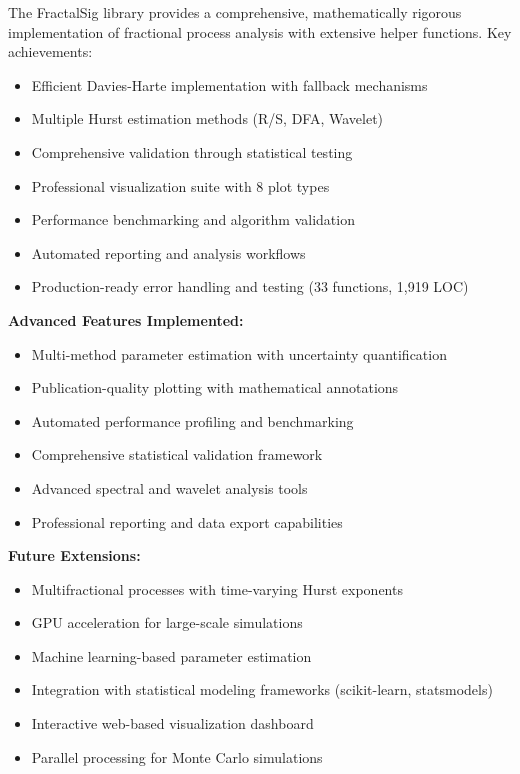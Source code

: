 \documentclass[11pt,a4paper]{article}
\begin{document}
The FractalSig library provides a comprehensive, mathematically rigorous implementation of fractional process analysis with extensive helper functions. Key achievements:

\begin{itemize}
    \item Efficient Davies-Harte implementation with fallback mechanisms
    \item Multiple Hurst estimation methods (R/S, DFA, Wavelet)
    \item Comprehensive validation through statistical testing
    \item Professional visualization suite with 8 plot types
    \item Performance benchmarking and algorithm validation
    \item Automated reporting and analysis workflows
    \item Production-ready error handling and testing (33 functions, 1,919 LOC)
\end{itemize}

\textbf{Advanced Features Implemented:}
\begin{itemize}
    \item Multi-method parameter estimation with uncertainty quantification
    \item Publication-quality plotting with mathematical annotations
    \item Automated performance profiling and benchmarking
    \item Comprehensive statistical validation framework
    \item Advanced spectral and wavelet analysis tools
    \item Professional reporting and data export capabilities
\end{itemize}

\textbf{Future Extensions:}
\begin{itemize}
    \item Multifractional processes with time-varying Hurst exponents
    \item GPU acceleration for large-scale simulations
    \item Machine learning-based parameter estimation
    \item Integration with statistical modeling frameworks (scikit-learn, statsmodels)
    \item Interactive web-based visualization dashboard
    \item Parallel processing for Monte Carlo simulations
\end{itemize}
\end{document}
